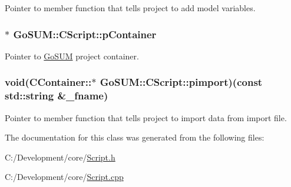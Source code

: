 Pointer to member function that tells project to add model variables. 

\hypertarget{class_go_s_u_m_1_1_c_script_a0434cbf97af11bf18d4d9c61bb10abc5}{
\subsubsection[{p\-Container}]{$\ast$ Go\-S\-U\-M\-::\-C\-Script\-::p\-Container\hspace{0.3cm}{\ttfamily [private]}}}\label{class_go_s_u_m_1_1_c_script_a0434cbf97af11bf18d4d9c61bb10abc5}


Pointer to \hyperlink{struct_go_s_u_m}{Go\-S\-U\-M} project container. 

\hypertarget{class_go_s_u_m_1_1_c_script_a9c054f68ecb632cd954e7330bd59cda6}{
\subsubsection[{pimport}]{\setlength{\rightskip}{0pt plus 5cm}void(C\-Container\-::$\ast$ Go\-S\-U\-M\-::\-C\-Script\-::pimport)(const std\-::string \&\-\_\-fname)\hspace{0.3cm}{\ttfamily [private]}}}\label{class_go_s_u_m_1_1_c_script_a9c054f68ecb632cd954e7330bd59cda6}


Pointer to member function that tells project to import data from import file. 



The documentation for this class was generated from the following files\-:\begin{DoxyCompactItemize}
\item 
C\-:/\-Development/core/\hyperlink{_script_8h}{Script.\-h}\item 
C\-:/\-Development/core/\hyperlink{_script_8cpp}{Script.\-cpp}\end{DoxyCompactItemize}
